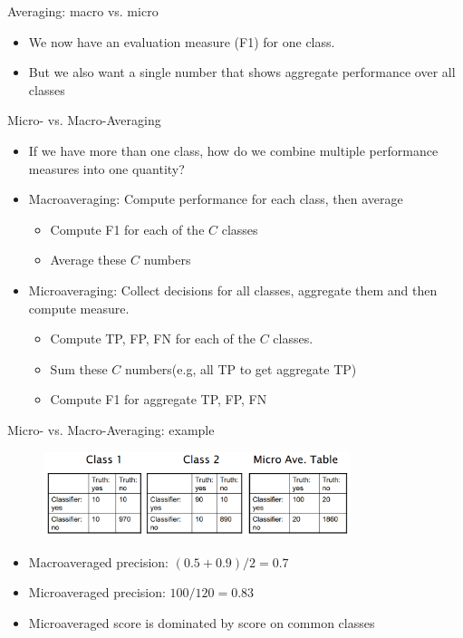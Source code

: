 \documentclass[serif, aspectratio=169]{beamer}
\begin{document}
\begin{frame}{Averaging: macro vs. micro}
    \begin{itemize}
        \item We now have an evaluation measure (F1) for one class.
        \item But we also want a single number that shows \textcolor{deepred}{aggregate performance} over all classes
    \end{itemize}
\end{frame}
\begin{frame}{Micro- vs. Macro-Averaging}
    \begin{itemize}
        \item If we have more than one class, how do we combine
multiple performance measures into one quantity?
        \item \textcolor{deepred}{Macroaveraging}: Compute performance for each class, then average
        \begin{itemize}
            \item Compute F1 for each of the $C$ classes
            \item Average these $C$ numbers
        \end{itemize}
        \item \textcolor{deepred}{Microaveraging}: Collect decisions for all classes, aggregate them and then compute measure.
        \begin{itemize}
            \item Compute TP, FP, FN for each of the $C$ classes.
            \item Sum these $C$ numbers(e.g, all TP to get aggregate TP)
            \item Compute F1 for aggregate TP, FP, FN
        \end{itemize}
    \end{itemize}
\end{frame}
\begin{frame}{Micro- vs. Macro-Averaging: example}
    \begin{figure}[h]
            \centering
            
            \includegraphics[width=0.8\textwidth]{pic/MicroVsMacro.png}
            \end{figure}
            
    \begin{itemize}
        \item Macroaveraged precision: $(0.5 + 0.9)/2 = 0.7$
        \item Microaveraged precision: $100/120 = 0.83$
        \item Microaveraged score is dominated by score on common classes
    \end{itemize}
\end{frame}
\end{document}
